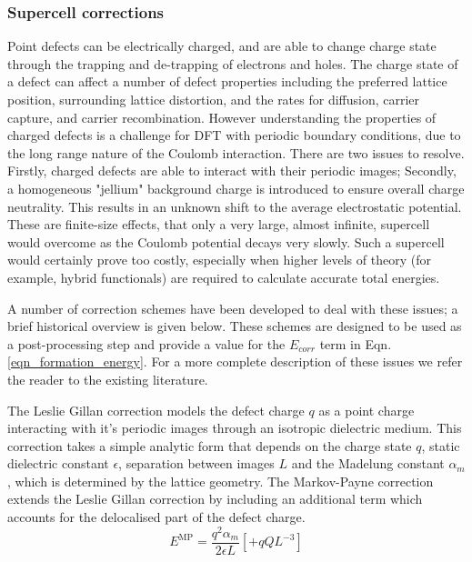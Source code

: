 \subsubsection{Supercell corrections}
Point defects can be electrically charged, and are able to change charge state through the trapping and de-trapping of electrons and holes. 
The charge state of a defect can affect a number of defect properties including the preferred lattice position, surrounding lattice distortion, and the rates for diffusion, carrier capture, and carrier recombination.
However understanding the properties of charged defects is a challenge for DFT with periodic boundary conditions, due to the long range nature of the Coulomb interaction.
There are two issues to resolve. 
Firstly, charged defects are able to interact with their periodic images; 
Secondly, a homogeneous "jellium" background charge is introduced to ensure overall charge neutrality. This results in an unknown shift to the average electrostatic potential. 
These are finite-size effects, that only a very large, almost infinite, supercell would overcome as the Coulomb potential decays very slowly.
Such a supercell would certainly prove too costly, especially when higher levels of theory (for example, hybrid functionals) are required to calculate accurate total energies.

A number of correction schemes have been developed to deal with these issues; a brief historical overview is given below. These schemes are designed to be used as a post-processing step and provide a value for the $E_{corr}$ term in Eqn.\ref{eqn_formation_energy}. For a more complete description of these issues we refer the reader to the existing literature.\cite{durrant2018,Vinichenko2017}

The Leslie Gillan correction\cite{Leslie1985} models the defect charge $q$ as a point charge interacting with it's periodic images through an isotropic dielectric medium. 
This correction takes a simple analytic form that depends on the charge state  $q$, static dielectric constant $\epsilon$, separation between images $L$ and the Madelung constant $\alpha_m$, which is determined by the lattice geometry.
The Markov-Payne correction extends the Leslie Gillan correction by including an additional term which accounts for the delocalised part of the defect charge. 
\begin{equation}
    E^\mathrm{MP} = \frac{q^2\alpha_{m}}{2\epsilon L} [+ qQL^{-3}]
\end{equation}

